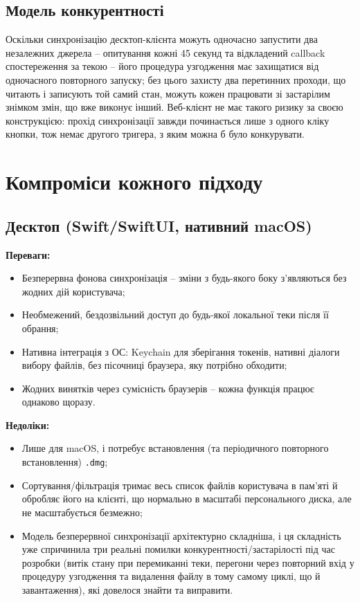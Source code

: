 \documentclass[12pt,a4paper]{article}
\begin{document}
\subsection{Модель конкурентності}

Оскільки синхронізацію десктоп-клієнта можуть одночасно запустити два незалежних джерела -- опитування кожні 45 секунд та відкладений callback спостереження за текою -- його процедура узгодження має захищатися від одночасного повторного запуску; без цього захисту два перетинних проходи, що читають і записують той самий стан, можуть кожен працювати зі застарілим знімком змін, що вже виконує інший. Веб-клієнт не має такого ризику за своєю конструкцією: прохід синхронізації завжди починається лише з одного кліку кнопки, тож немає другого тригера, з яким можна б було конкурувати.

\section{Компроміси кожного підходу}

\subsection{Десктоп (Swift/SwiftUI, нативний macOS)}

\textbf{Переваги:}
\begin{itemize}[nosep]
    \item Безперервна фонова синхронізація -- зміни з будь-якого боку з'являються без жодних дій користувача;
    \item Необмежений, бездозвільний доступ до будь-якої локальної теки після її обрання;
    \item Нативна інтеграція з ОС: Keychain для зберігання токенів, нативні діалоги вибору файлів, без пісочниці браузера, яку потрібно обходити;
    \item Жодних винятків через сумісність браузерів -- кожна функція працює однаково щоразу.
\end{itemize}

\textbf{Недоліки:}
\begin{itemize}[nosep]
    \item Лише для macOS, і потребує встановлення (та періодичного повторного встановлення) \texttt{.dmg};
    \item Сортування/фільтрація тримає весь список файлів користувача в пам'яті й обробляє його на клієнті, що нормально в масштабі персонального диска, але не масштабується безмежно;
    \item Модель безперервної синхронізації архітектурно складніша, і ця складність уже спричинила три реальні помилки конкурентності/застарілості під час розробки (витік стану при перемиканні теки, перегони через повторний вхід у процедуру узгодження та видалення файлу в тому самому циклі, що й завантаження), які довелося знайти та виправити.
\end{itemize}
\end{document}
